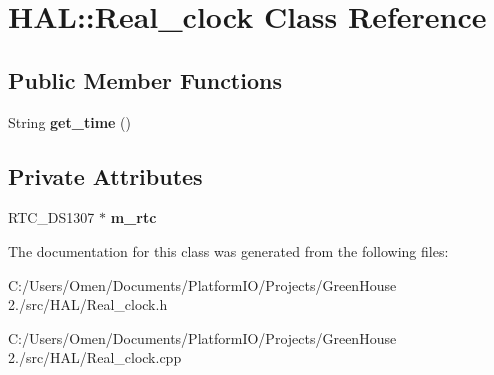 \hypertarget{class_h_a_l_1_1_real__clock}{}\section{H\+AL\+:\+:Real\+\_\+clock Class Reference}
\label{class_h_a_l_1_1_real__clock}
\subsection*{Public Member Functions}
\begin{DoxyCompactItemize}
\item 
\mbox{\label{class_h_a_l_1_1_real__clock_a8fd9d833cb1f59b0a76bc7021bd928ed}} 
String {\bfseries get\+\_\+time} ()
\end{DoxyCompactItemize}
\subsection*{Private Attributes}
\begin{DoxyCompactItemize}
\item 
\mbox{\label{class_h_a_l_1_1_real__clock_acd5dec8f59b76e6d07458ef28fc164b8}} 
R\+T\+C\+\_\+\+D\+S1307 $\ast$ {\bfseries m\+\_\+rtc}
\end{DoxyCompactItemize}


The documentation for this class was generated from the following files\+:\begin{DoxyCompactItemize}
\item 
C\+:/\+Users/\+Omen/\+Documents/\+Platform\+I\+O/\+Projects/\+Green\+House 2./src/\+H\+A\+L/Real\+\_\+clock.\+h\item 
C\+:/\+Users/\+Omen/\+Documents/\+Platform\+I\+O/\+Projects/\+Green\+House 2./src/\+H\+A\+L/Real\+\_\+clock.\+cpp\end{DoxyCompactItemize}
